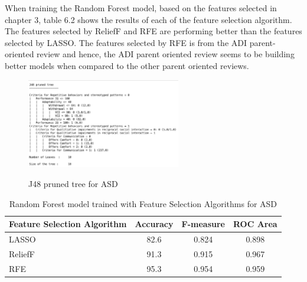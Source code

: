 When training the Random Forest model, based on the features selected in chapter 3, table 6.2 shows the results of each of the feature selection algorithm. The features selected by ReliefF and RFE are performing better than the features selected by LASSO. The features selected by RFE is from the ADI parent-oriented review and hence, the ADI parent oriented review seems to be building better models when compared to the other parent oriented reviews.
\begin{figure}
\centering
{\includegraphics[width=0.6\textwidth]{Figures/Figure_6_2.png}}
  \caption{ J48 pruned tree for ASD  }
  \label{fig:62}
\end{figure}
\begin{table}[h]
\begin{center}
\begin{tabular}{|l|c|c|c|}
\hline
\textbf{Feature Selection Algorithm}&	\textbf{Accuracy}&	\textbf{F-measure}&	\textbf{ROC Area}\\
\hline \hline
LASSO	&82.6 &	0.824	& 0.898\\
\hline
ReliefF &	91.3&	0.915&	0.967\\
\hline
RFE &	95.3 &	0.954 &	0.959\\
\hline
\end{tabular}
\end{center}
\caption{ Random Forest model trained with Feature Selection Algorithms for ASD }
\label{table:62}
\end{table}

